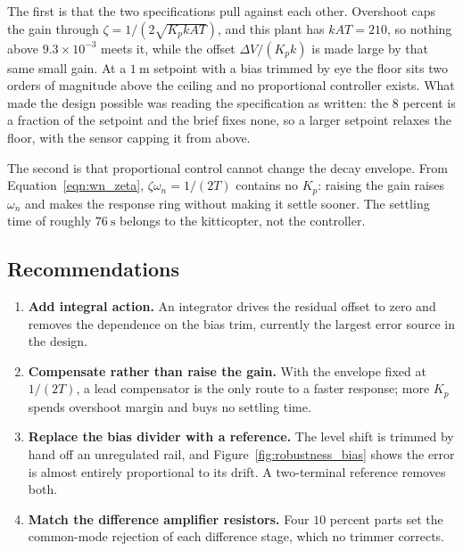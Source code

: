 The first is that the two specifications pull against each other. Overshoot caps the gain through
$\zeta = 1/(2\sqrt{K_p k A T})$, and this plant has $kAT = 210$, so nothing above
$9.3\times 10^{-3}$ meets it, while the offset $\Delta V/(K_p k)$ is made large by that same small
gain. At a $1\ \mathrm{m}$ setpoint with a bias trimmed by eye the floor sits two orders of
magnitude above the ceiling and no proportional controller exists. What made the design possible
was reading the specification as written: the $8$ percent is a fraction of the setpoint and the
brief fixes none, so a larger setpoint relaxes the floor, with the sensor capping it from above.

The second is that proportional control cannot change the decay envelope. From
Equation~\eqref{eqn:wn_zeta}, $\zeta\omega_n = 1/(2T)$ contains no $K_p$: raising the gain raises
$\omega_n$ and makes the response ring without making it settle sooner. The settling time of
roughly $76\ \mathrm{s}$ belongs to the kitticopter, not the controller.

\subsection{Recommendations}
\begin{enumerate}
    \item \textbf{Add integral action.} An integrator drives the residual offset to zero and
    removes the dependence on the bias trim, currently the largest error source in the design.
    \item \textbf{Compensate rather than raise the gain.} With the envelope fixed at $1/(2T)$, a
    lead compensator is the only route to a faster response; more $K_p$ spends overshoot margin and
    buys no settling time.
    \item \textbf{Replace the bias divider with a reference.} The level shift is trimmed by hand
    off an unregulated rail, and Figure~\ref{fig:robustness_bias} shows the error is almost
    entirely proportional to its drift. A two-terminal reference removes both.
    \item \textbf{Match the difference amplifier resistors.} Four $10$ percent parts set the
    common-mode rejection of each difference stage, which no trimmer corrects.
\end{enumerate}
